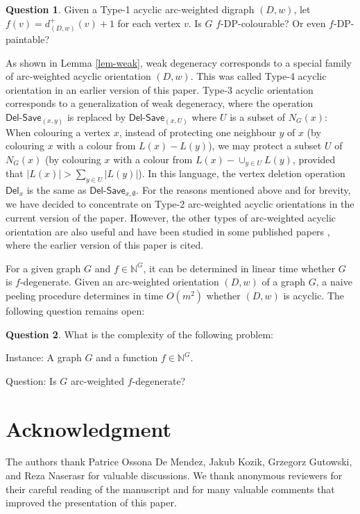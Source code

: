 \documentclass[11pt,a4paper]{article}
\theoremstyle{definition}
\newtheorem{question}{Question}
\newcommand{\dd}{\textsf{Del}}
\newcommand{\ds}{\textsf{Del-Save}}
\begin{document}
\begin{question}
    \label{q2}
    Given a Type-1 acyclic arc-weighted digraph $(D,w)$, let $f(v)= d_{(D, w)}^+(v)+1$ for each vertex $v$. Is $G$  $f$-DP-colourable? Or even $f$-DP-paintable?
\end{question} 

As shown in Lemma \ref{lem-weak}, weak degeneracy corresponds to a special family of arc-weighted acyclic orientation $(D,w)$. This was called Type-4 acyclic orientation in an earlier version of this paper. Type-3 acyclic orientation corresponds to a generalization of weak degeneracy, where the operation 
$\ds_{(x,y)}$ is replaced by $\ds_{(x,U)}$ where $U$ is a subset of $N_G(x)$: When colouring a vertex $x$, instead of protecting one neighbour $y$ of $x$ (by colouring $x$ with a colour from $L(x)-L(y)$), we may protect a subset $U$ of $N_G(x)$ (by colouring $x$ with a colour from $L(x)- \cup_{y \in U}L(y)$, provided that $|L(x)| > \sum_{y \in U}|L(y)|$). In this language, the vertex deletion operation $\dd_x$ is the same as $\ds_{x, \emptyset}$. For the reasons mentioned above and for brevity, we have decided to concentrate on Type-2 arc-weighted acyclic orientations in the current version of the paper. However, the other types of arc-weighted acyclic orientation are also useful and have been studied in some published papers \cite{BZ25,XZ25, LWY}, where the earlier version of this paper is cited. 

For a given graph $G$ and $f \in \mathbb{N}^G$, it can be determined in  linear time whether $G$ is $f$-degenerate. Given an arc-weighted orientation  $(D,w)$ of a graph $G$, a naive peeling procedure determines in  time $O(m^2)$  whether $(D,w)$ is acyclic. The  following question remains open:

\begin{question}
    \label{q3}
     What is the complexity of the following problem:
     
     Instance: A graph $G$ and a function $f \in \mathbb{N}^G$.
     
     Question: Is $G$ arc-weighted  $f$-degenerate?  
\end{question}




  \section*{Acknowledgment}
  The authors thank Patrice Ossona De Mendez, Jakub Kozik, Grzegorz Gutowski, and Reza Naserasr for valuable discussions. We thank anonymous reviewers for their careful reading of the manuscript and for many valuable comments that improved the presentation of this paper.



		
		
		
		
	
\end{document}

